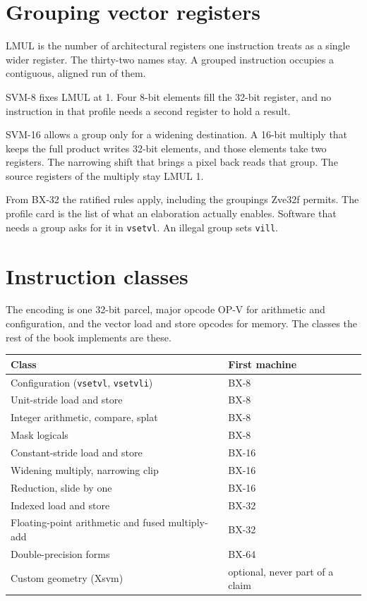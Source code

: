 \section{Grouping vector registers}

LMUL is the number of architectural registers one instruction treats as a single wider register. The thirty-two names stay. A grouped instruction occupies a contiguous, aligned run of them.

SVM-8 fixes LMUL at 1. Four 8-bit elements fill the 32-bit register, and no instruction in that profile needs a second register to hold a result.

SVM-16 allows a group only for a widening destination. A 16-bit multiply that keeps the full product writes 32-bit elements, and those elements take two registers. The narrowing shift that brings a pixel back reads that group. The source registers of the multiply stay LMUL 1.

From BX-32 the ratified rules apply, including the groupings Zve32f permits. The profile card is the list of what an elaboration actually enables. Software that needs a group asks for it in \texttt{vsetvl}. An illegal group sets \texttt{vill}.

\section{Instruction classes}

The encoding is one 32-bit parcel, major opcode OP-V for arithmetic and configuration, and the vector load and store opcodes for memory. The classes the rest of the book implements are these.

\begin{center}
\begin{tabular}{@{}ll@{}}
\toprule
Class & First machine \\
\midrule
Configuration (\texttt{vsetvl}, \texttt{vsetvli}) & BX-8 \\
Unit-stride load and store & BX-8 \\
Integer arithmetic, compare, splat & BX-8 \\
Mask logicals & BX-8 \\
Constant-stride load and store & BX-16 \\
Widening multiply, narrowing clip & BX-16 \\
Reduction, slide by one & BX-16 \\
Indexed load and store & BX-32 \\
Floating-point arithmetic and fused multiply-add & BX-32 \\
Double-precision forms & BX-64 \\
Custom geometry (Xsvm) & optional, never part of a claim \\
\bottomrule
\end{tabular}
\end{center}

